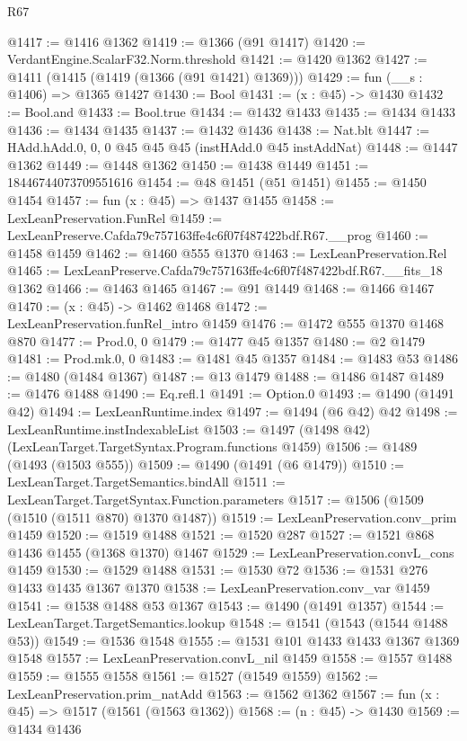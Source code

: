 \begin{lexlean}{R67}
\begin{coremodule}
@1417 := @1416 @1362
@1419 := @1366 (@91 @1417)
@1420 := VerdantEngine.ScalarF32.Norm.threshold
@1421 := @1420 @1362
@1427 := @1411 (@1415 (@1419 (@1366 (@91 @1421) @1369)))
@1429 := fun (__s : @1406) => @1365 @1427
@1430 := Bool
@1431 := (x : @45) -> @1430
@1432 := Bool.and
@1433 := Bool.true
@1434 := @1432 @1433
@1435 := @1434 @1433
@1436 := @1434 @1435
@1437 := @1432 @1436
@1438 := Nat.blt
@1447 := HAdd.hAdd.{0, 0, 0} @45 @45 @45 (instHAdd.{0} @45 instAddNat)
@1448 := @1447 @1362
@1449 := @1448 @1362
@1450 := @1438 @1449
@1451 := 18446744073709551616
@1454 := @48 @1451 (@51 @1451)
@1455 := @1450 @1454
@1457 := fun (x : @45) => @1437 @1455
@1458 := LexLeanPreservation.FunRel
@1459 := LexLeanPreserve.Cafda79c757163ffe4c6f07f487422bdf.R67.__prog
@1460 := @1458 @1459
@1462 := @1460 @555 @1370
@1463 := LexLeanPreservation.Rel
@1465 := LexLeanPreserve.Cafda79c757163ffe4c6f07f487422bdf.R67.__fits_18 @1362
@1466 := @1463 @1465
@1467 := @91 @1449
@1468 := @1466 @1467
@1470 := (x : @45) -> @1462 @1468
@1472 := LexLeanPreservation.funRel_intro @1459
@1476 := @1472 @555 @1370 @1468 @870
@1477 := Prod.{0, 0}
@1479 := @1477 @45 @1357
@1480 := @2 @1479
@1481 := Prod.mk.{0, 0}
@1483 := @1481 @45 @1357
@1484 := @1483 @53
@1486 := @1480 (@1484 @1367)
@1487 := @13 @1479
@1488 := @1486 @1487
@1489 := @1476 @1488
@1490 := Eq.refl.{1}
@1491 := Option.{0}
@1493 := @1490 (@1491 @42)
@1494 := LexLeanRuntime.index
@1497 := @1494 (@6 @42) @42
@1498 := LexLeanRuntime.instIndexableList
@1503 := @1497 (@1498 @42) (LexLeanTarget.TargetSyntax.Program.functions @1459)
@1506 := @1489 (@1493 (@1503 @555))
@1509 := @1490 (@1491 (@6 @1479))
@1510 := LexLeanTarget.TargetSemantics.bindAll
@1511 := LexLeanTarget.TargetSyntax.Function.parameters
@1517 := @1506 (@1509 (@1510 (@1511 @870) @1370 @1487))
@1519 := LexLeanPreservation.conv_prim @1459
@1520 := @1519 @1488
@1521 := @1520 @287
@1527 := @1521 @868 @1436 @1455 (@1368 @1370) @1467
@1529 := LexLeanPreservation.convL_cons @1459
@1530 := @1529 @1488
@1531 := @1530 @72
@1536 := @1531 @276 @1433 @1435 @1367 @1370
@1538 := LexLeanPreservation.conv_var @1459
@1541 := @1538 @1488 @53 @1367
@1543 := @1490 (@1491 @1357)
@1544 := LexLeanTarget.TargetSemantics.lookup
@1548 := @1541 (@1543 (@1544 @1488 @53))
@1549 := @1536 @1548
@1555 := @1531 @101 @1433 @1433 @1367 @1369 @1548
@1557 := LexLeanPreservation.convL_nil @1459
@1558 := @1557 @1488
@1559 := @1555 @1558
@1561 := @1527 (@1549 @1559)
@1562 := LexLeanPreservation.prim_natAdd
@1563 := @1562 @1362
@1567 := fun (x : @45) => @1517 (@1561 (@1563 @1362))
@1568 := (n : @45) -> @1430
@1569 := @1434 @1436

\end{coremodule}
\end{lexlean}

